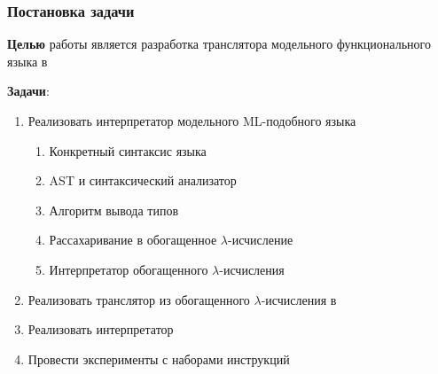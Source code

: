 \documentclass
  [ russian
  , aspectratio=169 %
  ] {beamer}
\begin{document}
\begin{frame}
    \frametitle{Постановка задачи}
    \textbf{Целью} работы является разработка транслятора модельного функционального языка в \INs{}
    \vspace{1em}

    \textbf{Задачи}:
    \begin{enumerate}
        \item Реализовать интерпретатор модельного ML-подобного языка
              \begin{enumerate}
                  \item Конкретный синтаксис языка
                  \item AST и синтаксический анализатор
                  \item Алгоритм вывода типов
                  \item Рассахаривание в обогащенное $\lambda$-исчисление
                  \item Интерпретатор обогащенного $\lambda$-исчисления
              \end{enumerate}
        \item Реализовать транслятор из обогащенного $\lambda$-исчисления в \INs{}
        \item Реализовать интерпретатор \INs{}
        \item Провести эксперименты с наборами инструкций
    \end{enumerate}
\end{frame}
\end{document}
